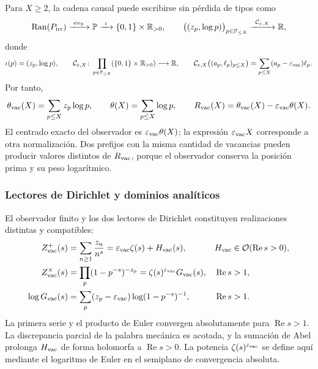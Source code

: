 Para \(X\geq2\), la cadena causal puede escribirse sin p\'erdida de tipos
como
\begin{equation}
 \operatorname{Ran}(P_{\rm irr})
 \xrightarrow{\ \operatorname{ev}_9\ }
 \mathbb P
 \xrightarrow{\ \iota\ }
 \{0,1\}\times\mathbb R_{>0},
 \qquad
 \bigl((z_p,\log p)\bigr)_{p\in\mathbb P_{\leq X}}
 \xrightarrow{\ \mathcal C_{\varepsilon,X}\ }
 \mathbb R,
 \label{eq:f051-typed-chain}
\end{equation}
donde
\[
 \iota(p)=(z_p,\log p),
 \qquad
 \mathcal C_{\varepsilon,X}\colon
 \prod_{p\in\mathbb P_{\leq X}}
       (\{0,1\}\times\mathbb R_{>0})\longrightarrow\mathbb R,
 \qquad
 \mathcal C_{\varepsilon,X}\bigl((a_p,\ell_p)_{p\leq X}\bigr)
 =\sum_{p\leq X}(a_p-\varepsilon_{\rm vac})\ell_p .
\]
Por tanto,
\begin{equation}
 \theta_{\rm vac}(X)=\sum_{p\leq X}z_p\log p,
 \qquad
 \theta(X)=\sum_{p\leq X}\log p,
 \qquad
 R_{\rm vac}(X)=\theta_{\rm vac}(X)
                   -\varepsilon_{\rm vac}\theta(X).
 \label{eq:f051-rvac-chebyshev}
\end{equation}
El centrado exacto del observador es
\(\varepsilon_{\rm vac}\theta(X)\); la expresi\'on
\(\varepsilon_{\rm vac}X\) corresponde a otra normalizaci\'on. Dos prefijos
con la misma cantidad de vacancias pueden producir valores distintos de
\(R_{\rm vac}\), porque el observador conserva la posici\'on prima y su peso
logar\'itmico.

\subsubsection{Lectores de Dirichlet y dominios analíticos}

El observador finito y los dos lectores de Dirichlet constituyen
realizaciones distintas y compatibles:
\begin{align}
 Z^{+}_{\rm vac}(s)
   &=\sum_{n\geq1}\frac{z_n}{n^s}
     =\varepsilon_{\rm vac}\zeta(s)+H_{\rm vac}(s),
 & H_{\rm vac}&\in\mathcal O(\operatorname{Re}s>0),
 \nonumber\\
 Z^{\times}_{\rm vac}(s)
   &=\prod_p(1-p^{-s})^{-z_p}
     =\zeta(s)^{\varepsilon_{\rm vac}}G_{\rm vac}(s),
 & \operatorname{Re}s&>1,
 \label{eq:f051-dirichlet-readers}\\
 \log G_{\rm vac}(s)
   &=\sum_p(z_p-\varepsilon_{\rm vac})
       \log(1-p^{-s})^{-1},
 & \operatorname{Re}s&>1.
 \nonumber
\end{align}
La primera serie y el producto de Euler convergen absolutamente para
\(\operatorname{Re}s>1\). La discrepancia parcial de la palabra mec\'anica
es acotada, y la sumaci\'on de Abel prolonga \(H_{\rm vac}\) de forma
holomorfa a \(\operatorname{Re}s>0\). La potencia
\(\zeta(s)^{\varepsilon_{\rm vac}}\) se define aqu\'i mediante el logaritmo
de Euler en el semiplano de convergencia absoluta.

